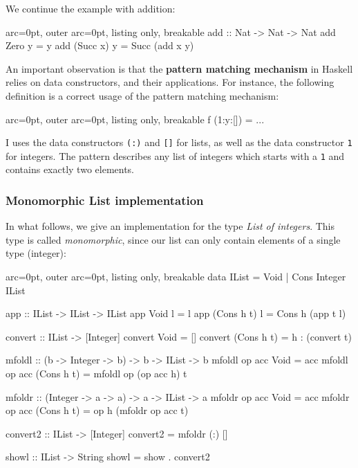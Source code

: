 We continue the example with addition:


\begin{tcblisting}{ arc=0pt, outer arc=0pt, listing only, breakable}
add :: Nat -> Nat -> Nat
add Zero y = y
add (Succ x) y = Succ (add x y)

\end{tcblisting}


An important observation is that the \textbf{pattern matching mechanism} in Haskell relies on data constructors, and their applications. For instance, the following definition is a correct usage of the pattern matching mechanism:

\begin{tcblisting}{ arc=0pt, outer arc=0pt, listing only, breakable}
f (1:y:[]) = ...

\end{tcblisting}

I uses the data constructors \texttt{(:)} and \texttt{[]} for lists, as well as the data constructor \texttt{1} for integers. The pattern describes any list of integers which starts with a \texttt{1} and contains exactly two elements.

\subsubsection*{ Monomorphic List implementation }

In what follows, we give an implementation for the type \textit{List of integers}. This type is called \textit{monomorphic}, since our list can only contain elements of a single type (integer):


\begin{tcblisting}{ arc=0pt, outer arc=0pt, listing only, breakable}
data IList = Void | Cons Integer IList

app :: IList -> IList -> IList
app Void l = l
app (Cons h t) l = Cons h (app t l)

convert :: IList -> [Integer]
convert Void = []
convert (Cons h t) = h : (convert t)

mfoldl :: (b -> Integer -> b) -> b -> IList -> b
mfoldl op acc Void = acc
mfoldl op acc (Cons h t) = mfoldl op (op acc h) t

mfoldr :: (Integer -> a -> a) -> a -> IList -> a
mfoldr op acc Void = acc
mfoldr op acc (Cons h t) = op h (mfoldr op acc t)

convert2 :: IList -> [Integer]
convert2 = mfoldr (:) []

showl :: IList -> String
showl = show . convert2


\end{tcblisting}


